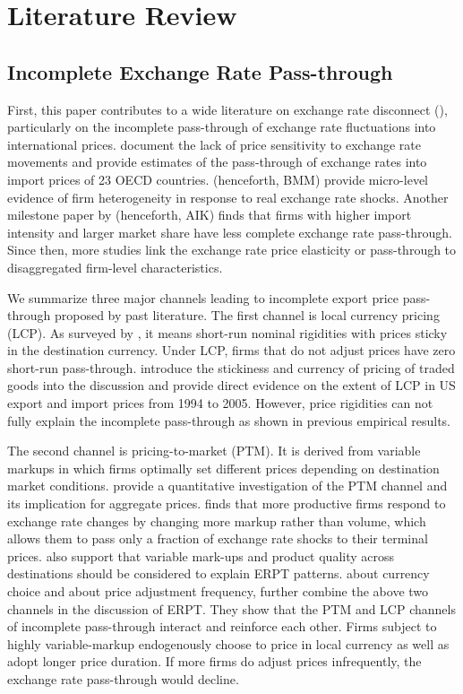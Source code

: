 \chapter{Literature Review} \label{sec-2.literature}

\section{Incomplete Exchange Rate Pass-through}

First, this paper contributes to a wide literature on exchange rate disconnect (\cite{obstfeld2000}),  particularly on the incomplete pass-through of exchange rate fluctuations into international prices. \cite{campa2005} document the lack of price sensitivity to exchange rate movements and provide estimates of the pass-through of exchange rates into import prices of 23 OECD countries. \cite{bmm2012} (henceforth, BMM) provide micro-level evidence of firm heterogeneity in response to real exchange rate shocks. Another milestone paper by \cite{aik2014} (henceforth, AIK) finds that firms with higher import intensity and larger market share have less complete exchange rate pass-through. Since then, more studies link the exchange rate price elasticity or pass-through to disaggregated firm-level characteristics.

We summarize three major channels leading to incomplete export price pass-through proposed by past literature. The first channel is local currency pricing (LCP). As surveyed by \cite{engel2002}, it means short-run nominal rigidities with prices sticky in the destination currency. Under LCP, firms that do not adjust prices have zero short-run pass-through. \cite{gopinath2008} introduce the stickiness and currency of pricing of traded goods into the discussion and provide direct evidence on the extent of LCP in US export and import prices from 1994 to 2005.  However, price rigidities can not fully explain the incomplete pass-through as shown in previous empirical results.

The second channel is pricing-to-market (PTM). It is derived from variable markups in which firms optimally set different prices depending on destination market conditions. \cite{atkeson2008} provide a quantitative investigation of the PTM channel and its implication for aggregate prices. \cite{bmm2012} finds that more productive firms respond to exchange rate changes by changing more markup rather than volume, which allows them to pass only a fraction of exchange rate shocks to their terminal prices. \cite{manova-zhang2012} also support that variable mark-ups and product quality across destinations should be considered to explain ERPT patterns. \cite{gopinath2010-currency} about currency choice and \cite{gopinath2010-frequency} about price adjustment frequency, further combine the above two channels in the discussion of ERPT. They show that the PTM and LCP channels of incomplete pass-through interact and reinforce each other. Firms subject to highly variable-markup endogenously choose to price in local currency as well as adopt longer price duration. If more firms do adjust prices infrequently, the exchange rate pass-through would decline.

